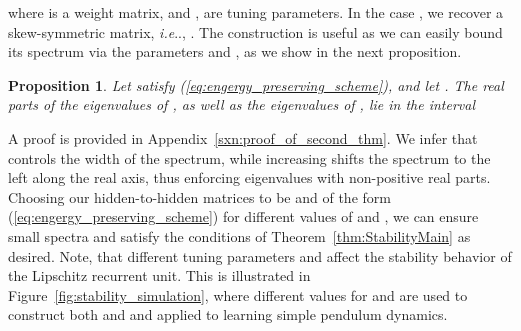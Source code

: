 \documentclass{article} \usepackage{iclr2021_conference,times}
\makeatletter
\newtheorem{proposition}{Proposition}
\DeclareRobustCommand\onedot{\futurelet\@let@token\@onedot}
\def\@onedot{\ifx\@let@token.\else.\null\fi\xspace}
\def\ie{\emph{i.e}\onedot} \def\Ie{\emph{I.e}\onedot}
\makeatother
\begin{document}
where  is a weight matrix, and ,  are tuning parameters. In the case , we recover a skew-symmetric matrix, \ie, . The construction  is useful as we can easily bound its spectrum via the parameters  and , as we show in the next proposition. 
\begin{proposition}
\label{thm:our_second_thm}
Let  satisfy (\ref{eq:engergy_preserving_scheme}), and let . The real parts  of the eigenvalues of , as well as the eigenvalues of , lie in the interval
\end{proposition}
A proof is provided in Appendix~\ref{sxn:proof_of_second_thm}. We infer that   controls the width of the spectrum, while increasing  shifts the spectrum to the left along the real axis, thus enforcing eigenvalues with non-positive real parts. Choosing our hidden-to-hidden matrices to be  and  of the form (\ref{eq:engergy_preserving_scheme}) for different values of  and , we can ensure small spectra and satisfy the conditions of Theorem~\ref{thm:StabilityMain} as desired. 
Note, that different tuning parameters  and  affect the stability behavior of the Lipschitz recurrent unit. 
This is illustrated in Figure~\ref{fig:stability_simulation}, where different values for  and  are used to construct both  and  and applied to learning simple pendulum dynamics.
\end{document}
